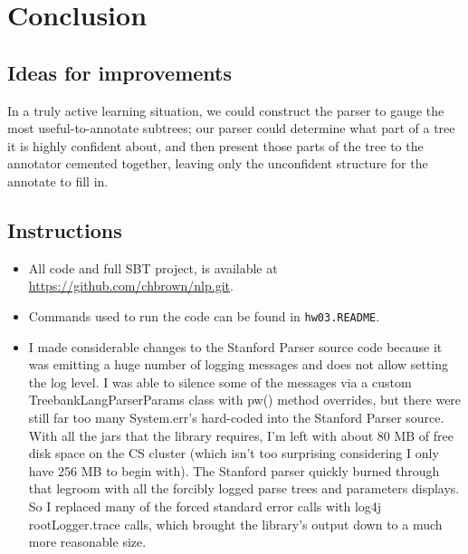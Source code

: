 \documentclass[10pt]{article}\usepackage{graphicx, color}
\begin{document}
\section{Conclusion}


\subsection*{Ideas for improvements}

In a truly active learning situation, we could construct the parser to gauge the most useful-to-annotate subtrees; our parser could determine what part of a tree it is highly confident about, and then present those parts of the tree to the annotator cemented together, leaving only the unconfident structure for the annotate to fill in.



\subsection{Instructions}

\begin{itemize}
  \item All code and full SBT project, is available at \url{https://github.com/chbrown/nlp.git}.
  \item Commands used to run the code can be found in \texttt{hw03.README}.
  \item I made considerable changes to the Stanford Parser source code because it was emitting a huge number of logging messages and does not allow setting the log level. I was able to silence some of the messages via a custom TreebankLangParserParams class with pw() method overrides, but there were still far too many System.err's hard-coded into the Stanford Parser source. With all the jars that the library requires, I'm left with about 80 MB of free disk space on the CS cluster (which isn't too surprising considering I only have 256 MB to begin with). The Stanford parser quickly burned through that legroom with all the forcibly logged parse trees and parameters displays. So I replaced many of the forced standard error calls with log4j rootLogger.trace calls, which brought the library's output down to a much more reasonable size.
\end{itemize}
\end{document}
